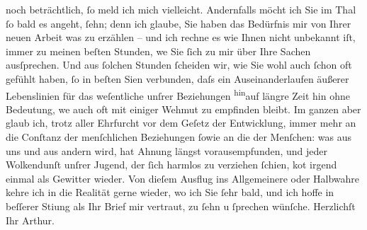\begin{ledgroupsized}[t]{13cm}
               noch beträchtlich, ſo meld ich mich vielleicht. Andernfalls möcht ich Sie im Thal ſo
               bald es angeht, ſehn; denn ich glaube, {\pb}Sie haben das
               Bedürfnis mir von Ihrer neuen Arbeit was zu erzählen – und ich rechne es wie Ihnen nicht unbekannt iſt,
               immer zu meinen beſten Stunden, we{\geminationn} Sie ſich zu mir über
               Ihre Sachen ausſprechen. Und aus ſolchen Stunden ſcheiden wir, wie Sie wohl auch
               ſchon oft gefühlt haben, ſo in beſten Si{\geminationn}en verbunden,
               daſs ein Auseinanderlaufen äußerer Lebenslinien für das weſentliche unſrer
               Beziehungen \substVorne{}\textsuperscript{hin}\substDazwischen{}auf\substHinten{} längre Zeit \introOben{}hin\introOben{} ohne Bedeutung, we{\geminationn} auch oft mit einiger Wehmut zu empfinden bleibt. Im
               ganzen aber glaub ich, trotz aller Ehrfurcht vor dem Geſetz der Entwicklung, immer
               mehr an die Conſtanz der \introOben{}menſchlichen\introOben{} Beziehungen \introOben{}ſo\introOben{}wie an die der Menſchen: was aus uns und aus andern wird,
               hat Ahnung längst vorausempfunden, und jeder Wolkendunſt unſrer Jugend, der ſich
               harmlos zu verziehen ſchien, ko{\geminationm}t irgend einmal als
               Gewitter wieder. Von dieſem Ausflug ins Allgemeinere oder Halbwahre kehre ich in die
               Realität gerne wieder, wo ich Sie ſehr bald, und ich hoffe in beſſerer Sti{\geminationm}ung als Ihr Brief mir vertraut, zu ſehn u ſprechen
               wünſche.\pend
           \pstart Herzlichſt Ihr \spacefill\mbox{Arthur.}\pend{}          \endnumbering{}\end{ledgroupsized}  \newcommand{\dateiname}{L02168}\newcommand{\titel}{Arthur Schnitzler an Hugo von Hofmannsthal, 28. 3. 1914}\newcommand{\editorInnen}{Martin Anton Müller und Gerd-Hermann Susen}
      